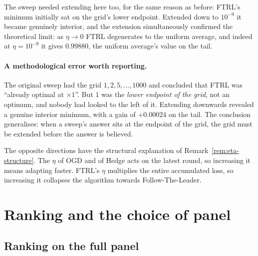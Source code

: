 \documentclass[12pt,a4paper,oneside]{report}
\renewcommand{\_}{\oldunderscore\allowbreak}
\theoremstyle{definition}
\theoremstyle{plain}
\theoremstyle{definition}   %
\begin{document}
The sweep needed extending here too, for the same reason as before: FTRL's minimum initially sat
on the grid's lower endpoint. Extended down to $10^{-9}$ it became genuinely interior, and the
extension simultaneously confirmed the theoretical limit: as $\eta \to 0$ FTRL degenerates to the
uniform average, and indeed at $\eta=10^{-9}$ it gives $0.99880$, the uniform average's value on
the tail.

\paragraph{A methodological error worth reporting.} The original sweep had the grid
$1, 2, 5,\allowbreak \dots,\allowbreak 1000$ and concluded that FTRL was ``already optimal at $\times 1$''.
But $1$ was the \emph{lower endpoint of the grid}, not an optimum, and nobody had looked to the
left of it. Extending downwards revealed a genuine interior minimum, with a gain of $+0.00024$ on
the tail. The conclusion generalises: when a sweep's answer sits at the
endpoint of the grid, the grid must be extended before the answer is believed.

The opposite directions have the structural explanation of Remark~\ref{rem:eta-structure}.
The $\eta$ of OGD and of Hedge acts on the latest round, so increasing it means adapting faster.
FTRL's $\eta$ multiplies the entire accumulated loss, so increasing it collapses the algorithm
towards Follow-The-Leader.

\section{Ranking and the choice of panel}

\subsection{Ranking on the full panel}
\label{sec:res-ranking}
\end{document}
